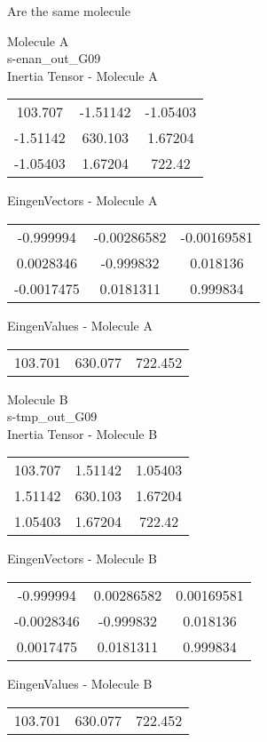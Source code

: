 \begin{center}
\vtab
\vtab
\textcolor{NavyBlue}{\Large Are the same molecule}
\end{center}
\newpage
\begin{multicols}{2}
\begin{center}
Molecule A \\ 
s-enan\_out\_G09
\\
Inertia Tensor - Molecule A \\
\vtab
\begin{tabular}{|c c c|}
103.707	 & 	-1.51142	 & 	-1.05403	 \\
-1.51142	 & 	630.103	 & 	1.67204	 \\
-1.05403	 & 	1.67204	 & 	722.42
\end{tabular}

\vtab
 EingenVectors - Molecule A     \\
\vtab
\begin{tabular}{|c c c|}
-0.999994	 & 	-0.00286582	 & 	-0.00169581	 \\
0.0028346	 & 	-0.999832	 & 	0.018136	 \\
-0.0017475	 & 	0.0181311	 & 	0.999834
\end{tabular}

\vtab
 EingenValues - Molecule A     \\
\vtab
\begin{tabular}{|c c c|}
103.701	 & 	630.077	 & 	722.452
\end{tabular}
\columnbreak

Molecule B \\ 
s-tmp\_out\_G09
\\
Inertia Tensor - Molecule B \\
\vtab
\begin{tabular}{|c c c|}
103.707	 & 	1.51142	 & 	1.05403	 \\
1.51142	 & 	630.103	 & 	1.67204	 \\
1.05403	 & 	1.67204	 & 	722.42
\end{tabular}

\vtab
 EingenVectors - Molecule B     \\
\vtab
\begin{tabular}{|c c c|}
-0.999994	 & 	0.00286582	 & 	0.00169581	 \\
-0.0028346	 & 	-0.999832	 & 	0.018136	 \\
0.0017475	 & 	0.0181311	 & 	0.999834
\end{tabular}

\vtab
 EingenValues - Molecule B     \\
\vtab
\begin{tabular}{|c c c|}
103.701	 & 	630.077	 & 	722.452
\end{tabular}

\end{center}
\end{multicols}
